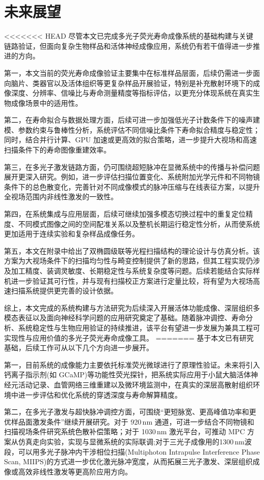 \section{未来展望}\label{7.2}

<<<<<<< HEAD
尽管本文已完成多光子荧光寿命成像系统的基础构建与关键链路验证，但面向复杂生物样品和活体神经成像应用，系统仍有若干值得进一步推进的方向。

第一，本文当前的荧光寿命成像验证主要集中在标准样品层面，后续仍需进一步面向脑片、类器官以及活体组织等更复杂样品开展验证，特别是补充散射环境下的成像深度、分辨率、信噪比与寿命测量精度等指标评估，以更充分体现系统在真实生物成像场景中的适用性。

第二，在寿命拟合与数据处理方面，后续可进一步加强低光子计数条件下的噪声建模、参数约束与鲁棒性分析，系统评估不同信噪比条件下寿命拟合精度与稳定性；同时，结合并行计算、GPU 加速或更高效的拟合策略，进一步提升大视场和高速扫描条件下的寿命图像重建效率。

第三，在多光子激发链路方面，仍可围绕超短脉冲在显微系统中的传播与补偿问题展开更深入研究。例如，进一步评估扫描位置变化、系统附加光学元件和不同物镜条件下的总色散变化，完善针对不同成像模式的脉冲压缩与在线表征方案，以提升全视场范围内非线性激发的一致性。

第四，在系统集成与应用层面，后续可继续加强多模态切换过程中的重复定位精度、不同模式图像之间的空间配准关系以及整机长期运行稳定性分析，从而使系统更加适用于连续实验和复杂样品成像任务。

第五，本文在附录中给出了双椭圆级联等光程扫描结构的理论设计与仿真分析。该方案为大视场条件下的扫描均匀性与畸变控制提供了新的思路，但其工程实现仍涉及加工精度、装调灵敏度、长期稳定性与系统复杂度等问题。后续若能结合实际样机进一步验证其可行性，并与现有扫描校正方案进行定量比较，将有望为大视场高速扫描系统提供更完善的设计依据。

综上，本文完成的系统构建与方法研究为后续深入开展活体功能成像、深层组织多模态表征以及面向神经科学问题的应用研究奠定了基础。随着脉冲调控、寿命分析、系统稳定性与生物应用验证的持续推进，该平台有望进一步发展为兼具工程可实现性与应用价值的多光子荧光寿命成像工具。
=======
基于本文已有研究基础，后续工作可从以下几个方向进一步展开。

第一，目前系统的成像能力主要依托标准荧光微球进行了原理性验证。未来将引入钙离子指示剂(如 GCaMP)等功能性荧光探针，把系统实际应用于小鼠大脑活体神经元活动记录、血管网络三维重建以及微环境监测中，在真实的深层高散射组织环境中进一步评估和优化系统的穿透深度与寿命解算精度。

第二，在多光子激发与超快脉冲调控方面，可围绕``更短脉宽、更高峰值功率和更优样品面激发条件''继续开展研究。对于 920\,nm 通道，可进一步结合不同物镜和扫描视场条件研究系统色散补偿策略；对于 1030\,nm 激光平台，可推动 MPC 方案从仿真走向实验，实现与显微系统的实际联调;对于三光子成像用的1300\,nm波段，可以用多光子脉冲内干涉相位扫描(Multiphoton Intrapulse Interference Phase Scan, MIIPS)的方式进一步优化激光脉冲宽度，从而拓展三光子激发、深层组织成像或高效非线性激发等更高阶应用方向。

